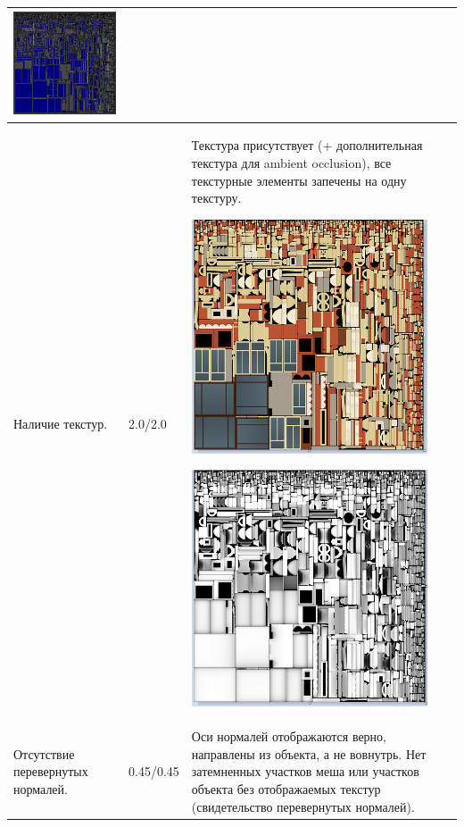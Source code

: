 \begin{longtable}{|l|l|l|}
    \includegraphics[width=7cm]{uv_1} \\
    \hline
    Наличие текстур. & 2.0/2.0 & Текстура присутствует (+ дополнительная текстура для ambient occlusion), все текстурные элементы запечены на одну текстуру.

    \includegraphics[width=7cm]{tec_1}

    \includegraphics[width=7cm]{tec_2}\\
    \hline
    Отсутствие перевернутых нормалей. & 0.45/0.45 & Оси нормалей отображаются верно, направлены из объекта, а не вовнутрь. Нет затемненных участков меша или участков объекта без отображаемых текстур (свидетельство перевернутых нормалей).


\end{longtable}
